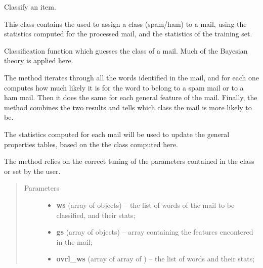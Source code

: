 \documentclass[letterpaper,10pt,english]{sphinxmanual}
\begin{document}
\begin{fulllineitems}
\label{index:classifier.Classifier}
Classify an item.

This class contains the {\hyperref[index:classifier.Classifier.classify]{}} used to
assign a class (spam/ham) to a mail, using the statistics computed
for the processed mail, and the statistics of the training set.

\begin{fulllineitems}
\label{index:classifier.Classifier.classify}
Classification function which guesses the class of a mail. Much of the
Bayesian theory is applied here.

The method iterates through all the words identified in the mail,
and for each one computes how much likely it is for the word to belong
to a spam mail or to a ham mail. Then it does the same for each general
feature of the mail. Finally, the method combines the two results
and tells which class the mail is more likely to be.

The statistics computed for each mail will be used to update the
general properties tables, based on the the class computed here.

The method relies on the correct tuning of the parameters contained in
the {\hyperref[index:config.Config]{}} class or set by the user.
\begin{quote}\begin{description}
\item[{Parameters}] \leavevmode\begin{itemize}
\item {} 
\textbf{ws} (array of {\hyperref[index:test_stat.Test_word]{}} objects) -- the list of words of the mail to be classified, and their stats;

\item {} 
\textbf{gs} (array of {\hyperref[index:test_stat.Test_stat]{}} objects) -- array containing the features encontered in the mail;

\item {} 
\textbf{ovrl\_ws} (array of array of {\hyperref[index:gen_stat.Word]{}}) -- the list of words and their stats;


\end{itemize}
\end{description}
\end{quote}
\end{fulllineitems}
\end{fulllineitems}
\end{document}
